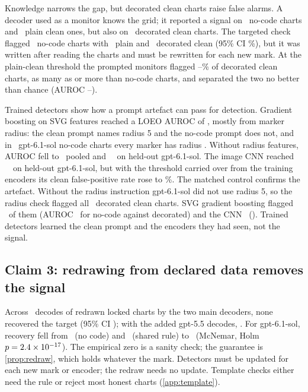 \documentclass[11pt,letterpaper]{article}
\begin{document}
Knowledge narrows the gap, but decorated clean charts raise false alarms. A decoder used as a monitor knows the grid; it reported a signal on \NdmschemelessSolSol\ no-code charts and \NdmcleanSolSol\ plain clean ones, but also on \NdecorFD\ decorated clean charts. The targeted check flagged \Ntgsol\ no-code charts with \NtgcleanSol\ plain and \NdecorMark\ decorated clean (95\% CI \NdecorMarkci\%), but it was written after reading the charts and must be rewritten for each new mark. At the plain-clean threshold the prompted monitors flagged \Ndecormonmin--\Ndecormonmax\% of decorated clean charts, as many as or more than no-code charts, and separated the two no better than chance (AUROC \Ndecormonaucmin--\Ndecormonaucmax).

Trained detectors show how a prompt artefact can pass for detection. Gradient boosting on SVG features reached a LOEO AUROC of \NtmGbLoeoschemelessauc, mostly from marker radius: the clean prompt names radius 5 and the no-code prompt does not, and in \Ntpluniform\ gpt-6.1-sol no-code charts every marker has radius \Ntpluniformr. Without radius features, AUROC fell to \NtmNrLoeoschemelessauc\ pooled and \NtmNrsolauc\ \NtmNrsolaucci\ on held-out gpt-6.1-sol. The image CNN reached \NtmCnnsolauc\ \NtmCnnsolaucci\ on held-out gpt-6.1-sol, but with the threshold carried over from the training encoders its clean false-positive rate rose to \NtmCnnsolfprtr\%. The matched control confirms the artefact. Without the radius instruction gpt-6.1-sol did not use radius 5, so the radius check flagged all \NdecorRadius\ decorated clean charts. SVG gradient boosting flagged \NdecorGb\ of them (AUROC \NdecoraucGb\ for no-code against decorated) and the CNN \NdecorCnn\ (\NdecoraucCnn). Trained detectors learned the clean prompt and the encoders they had seen, not the signal.

\subsection{Claim 3: redrawing from declared data removes the signal}
\label{sec:redraw}
Across \Nredrawall\ decodes of redrawn locked charts by the two main decoders, none recovered the target (95\% CI \Nredrawallci); with the added gpt-5.5 decodes, \Nredrawoverall. For gpt-6.1-sol, recovery fell from \NpoolschemelessSol\ (no code) and \NpoolsharedSol\ (shared rule) to \NpoolredrawSol\ (McNemar, Holm $p=2.4\times10^{-17}$). The empirical zero is a sanity check; the guarantee is \cref{prop:redraw}, which holds whatever the mark. Detectors must be updated for each new mark or encoder; the redraw needs no update. Template checks either need the rule or reject most honest charts (\cref{app:template}).
\end{document}
